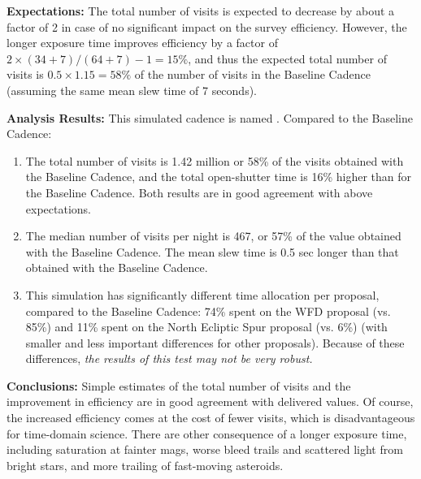 {\bf Expectations:} The total number of visits is expected to decrease by about
a factor of 2 in case of no significant impact on the survey efficiency.
However, the longer exposure time improves efficiency by a factor of
$2\times(34+7)/(64+7)-1=15\%$, and thus the expected total number of visits is
$0.5\times1.15 = 58\%$ of the number of visits in the Baseline Cadence (assuming
the same mean slew time of 7 seconds).

{\bf Analysis Results:} This simulated cadence is named .
Compared to the Baseline Cadence:
\begin{enumerate}
\item The total number of visits is 1.42 million or 58\% of the visits
obtained with the Baseline Cadence, and the total open-shutter time is
16\% higher than for the Baseline Cadence. Both results are in good
agreement with above expectations.
\item The median number of visits per night is 467, or 57\% of the
value obtained with the Baseline Cadence. The mean slew time is 0.5 sec
longer than that obtained with the Baseline Cadence.
\item This simulation has significantly different time allocation per
proposal, compared to the Baseline Cadence: 74\% spent on the WFD
proposal (vs. 85\%) and 11\%  spent on the North Ecliptic Spur proposal
(vs. 6\%)  (with smaller and less important differences for other
proposals). Because of these differences, {\it the results of this
test may not be very robust.}
\end{enumerate}

{\bf Conclusions:}
Simple estimates of the total number of visits and the
improvement in efficiency are in good agreement with delivered values. Of
course, the increased efficiency comes at the cost of fewer visits, which is
disadvantageous for time-domain science. There are other consequence of a longer
exposure time, including saturation at fainter mags, worse bleed trails and
scattered light from bright stars, and more trailing of fast-moving asteroids.



